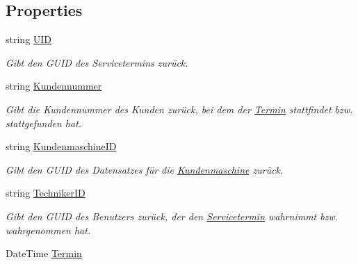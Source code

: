 \subsection*{Properties}
\begin{DoxyCompactItemize}
\item 
string \hyperlink{class_products_1_1_model_1_1_entities_1_1_servicetermin_afbee7719f5a0701e0ffa84b840273aa5}{U\+ID}
\begin{DoxyCompactList}\small\item\em Gibt den G\+U\+ID des Servicetermins zurück. \end{DoxyCompactList}\item 
string \hyperlink{class_products_1_1_model_1_1_entities_1_1_servicetermin_a99efd99366ef68cd9e205080fc022213}{Kundennummer}
\begin{DoxyCompactList}\small\item\em Gibt die Kundennummer des Kunden zurück, bei dem der \hyperlink{class_products_1_1_model_1_1_entities_1_1_termin}{Termin} stattfindet bzw. stattgefunden hat. \end{DoxyCompactList}\item 
string \hyperlink{class_products_1_1_model_1_1_entities_1_1_servicetermin_a42eb7f3ca9cafbd9d6f6ecd7db2e96d2}{Kundenmaschine\+ID}
\begin{DoxyCompactList}\small\item\em Gibt den G\+U\+ID des Datensatzes für die \hyperlink{class_products_1_1_model_1_1_entities_1_1_kundenmaschine}{Kundenmaschine} zurück. \end{DoxyCompactList}\item 
string \hyperlink{class_products_1_1_model_1_1_entities_1_1_servicetermin_a3aef8cc3560b79d669f4b60e6b26fadf}{Techniker\+ID}
\begin{DoxyCompactList}\small\item\em Gibt den G\+U\+ID des Benutzers zurück, der den \hyperlink{class_products_1_1_model_1_1_entities_1_1_servicetermin}{Servicetermin} wahrnimmt bzw. wahrgenommen hat. \end{DoxyCompactList}\item 
Date\+Time \hyperlink{class_products_1_1_model_1_1_entities_1_1_servicetermin_ad18665f5f87fdac83568d8ca706eee42}{Termin}

\end{DoxyCompactItemize}
